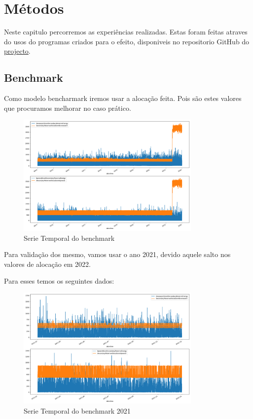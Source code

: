 \chapter{Métodos}

Neste capitulo percorremos as experiências realizadas. Estas foram feitas atraves do usos do programas criados para o efeito, disponiveis no repositorio GitHub do \href{https://github.com/JotaFan/renewable-generation-into-reserve-markets}{projecto}.

\section{Benchmark}

Como modelo bencharmark iremos usar a alocação feita. Pois são estes valores que procuramos melhorar no caso prático.



\begin{figure}[H]
    \centering
    \includegraphics[width=0.8\textwidth]{../plots/benchmark.png}
    \caption{Serie Temporal do benchmark}
    \label{fig:benchmark}
\end{figure}
  


Para validação dos mesmo, vamos usar o ano 2021, devido aquele salto nos valores de alocação em 2022.

Para esses temos os seguintes dados:

\begin{figure}[H]
    \centering
    \includegraphics[width=0.8\textwidth]{../plots/benchmark_validation.png}
    \caption{Serie Temporal do benchmark 2021}
    \label{fig:benchmark_validation}
\end{figure}
  

